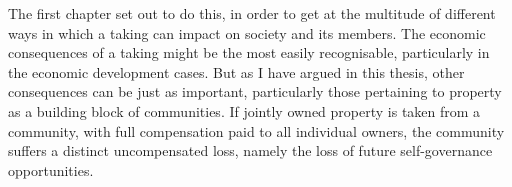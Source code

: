 {%



The first chapter set out to do this, in order to get at the multitude of different ways in which a taking can impact on society and its members. The economic consequences of a taking might be the most easily recognisable, particularly in the economic development cases. But as I have argued in this thesis, other consequences can be just as important, particularly those pertaining to property as a building block of communities. If jointly owned property is taken from a community, with full compensation paid to all individual owners, the community suffers a distinct uncompensated loss, namely the loss of future self-governance opportunities. %



}
